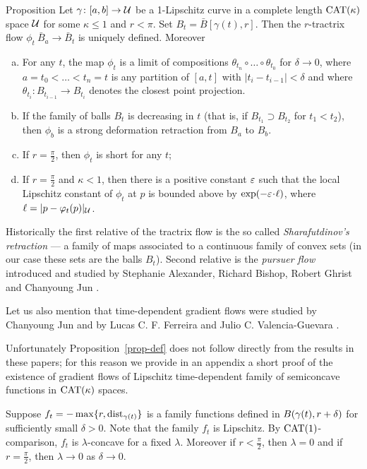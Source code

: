 \documentclass[oneside,a4paper, 12pt]{article}
\begin{document}
\begin{thm}{Proposition}\label{prop-def}
Let $\gamma\colon[a,b]\to \mathcal{U}$ be a 1-Lipschitz curve in a complete length $\mathrm{CAT}(\kappa)$ space $\mathcal{U}$ for some $\kappa\le 1$
and $r<\pi$.
Set $B_t=\bar B[\gamma(t),r]$.
Then the $r$-tractrix flow $\phi_t\:\bar B_a\to\bar B_t$ is uniquely defined.
Moreover
\begin{enumerate}[(a)]
\item  \label{approx} For any $t$, the map $\phi_t$ is a limit of compositions $\theta_{t_n} \circ \dots\circ \theta_{t_0}$
for $\delta \to 0$, where $a=t_0<\dots<t_n=t$ is any partition of $[a,t]$ with $|t_i-t_{i-1}|<\delta$
and where $\theta_{t_i} : B_{t_{i-1}}\to  B_{t_i}$  denotes the closest point projection.
\item \label{sharafutdinov} If the family of balls $B_t$ is decreasing in $t$ (that is, if $B_{t_1}\supset B_{t_2}$ for $t_1<t_2$), then $\phi_b$ is a strong deformation retraction from $B_a$ to $B_b$.
\item \label{non-strict} If $r=\tfrac\pi2$, then $\phi_t$ is short for any $t$;
 \item\label{strict} If $r=\tfrac\pi2$ and  $\kappa<1$, then there is a positive constant $\varepsilon$ such that the local Lipschitz constant of $\phi_t$ at $p$ is bounded above by $\exp(-\eps\cdot\ell)$, 
 where $\ell=|p-\varphi_t(p)|_{\mathcal{U}}$.
\end{enumerate}
\end{thm}

Historically the first relative of the tractrix flow
is the so called \emph{Sharafutdinov's retraction} \cite{sharafutdinov} --- a family of maps associated to a continuous family of convex sets (in our case these sets are the balls $B_t$). 
Second relative is the \emph{pursuer flow} introduced and studied by Stephanie Alexander, Richard Bishop, Robert Ghrist and Chanyoung Jun \cite{ABG,jun-thesis,jun,jun:grad}.

Let us also mention that time-dependent gradient flows were studied by Chanyoung Jun \cite{jun-thesis,jun:grad} and  by Lucas C. F. Ferreira and Julio C. Valencia-Guevara \cite{ferreira-valencia}.

Unfortunately Proposition~\ref{prop-def} does not follow directly from the results in these papers; for this reason we provide in an appendix a short proof of the existence of
gradient flows of Lipschitz time-dependent family of semiconcave functions in $\mathrm{CAT}(\kappa)$ spaces.

Suppose $f_t=- \max\{r,\mathop{\rm dist}\nolimits_{\gamma(t)}\}$ is a family functions defined in $B(\gamma(t),r\z+\delta)$ for sufficiently small $\delta>0$.
Note that the family $f_t$ is Lipschitz.
By $\mathrm{CAT}(1)$-comparison, $f_t$ is $\lambda$-concave for a fixed $\lambda$.
Moreover if $r<\tfrac\pi2$, then $\lambda=0$ and if $r=\tfrac\pi2$, then $\lambda\to 0$ as $\delta\to 0$. 
\end{document}
